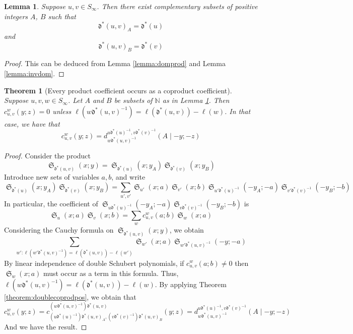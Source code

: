 \documentclass{amsart}
\newtheorem{lemma}{Lemma}[subsection]
\newtheorem{theorem}{Theorem}[section]
\theoremstyle{definition}
\newtheorem{example}[lemma]{Example}
\theoremstyle{remark}
\numberwithin{equation}{subsection}
\DeclareMathOperator{\sch}{\mathfrak{S}}
\newcommand{\cpcf}[5]{d^{#1,#2}_{#3}\left(#4\mid #5\right)}
\newcommand{\dom}{\mathfrak{d}}
\newcommand{\ldom}{\dom^*}
\begin{document}
\begin{lemma} \label{lemma:cansplit}
Suppose $u,v\in S_\infty$. Then there exist complementary subsets of positive integers $A$, $B$ such that
$$\ldom(u,v)_A=\ldom(u)$$
and
$$\ldom(u,v)_B=\ldom(v)$$
\end{lemma}
\begin{proof}
This can be deduced from Lemma \ref{lemma:domprod} and Lemma \ref{lemma:invdom}. 
\end{proof}

\begin{theorem}[Every product coefficient occurs as a coproduct coefficient] \label{theorem:allprod}
Suppose $u,v,w\in S_\infty$. Let $A$ and $B$ be subsets of $\mathbb{N}$ as in Lemma \ref{lemma:cansplit}. Then $c_{u,v}^w(y;z)=0$ unless $\ell(w\ldom(u,v)^{-1})=\ell(\ldom(u,v))-\ell(w)$. In that case, we have that 
$$c_{u,v}^w(y;z)=\cpcf{u\ldom(u)^{-1}}{v\ldom(v)^{-1}}{w\ldom(u,v)^{-1}}{A}{-y;-z}$$
\end{theorem}
\begin{proof}
Consider the product
$$\sch_{\ldom(u,v)}(x;y)=\sch_{\ldom(u)}(x;y_A)\sch_{\ldom(v)}(x;y_B)$$
Introduce new sets of variables $a,b$, and write
$$\sch_{\ldom(u)}(x;y_A)\sch_{\ldom(v)}(x;y_B)=\sum_{u',v'}\sch_{u'}(x;a)\sch_{v'}(x;b)\sch_{u'\ldom(u)^{-1}}(-y_A;-a)\sch_{v'\ldom(v)^{-1}}(-y_B;-b)$$
In particular, the coefficient of $\sch_{u\ldom(u)^{-1}}(-y_A;-a)\sch_{v\ldom(v)^{-1}}(-y_B;-b)$ is
$$\sch_u(x;a)\sch_v(x;b)=\sum_{w}c_{u,v}^w(a;b)\sch_w(x;a)$$
Considering the Cauchy formula on $\sch_{\ldom(u,v)}(x;y)$, we obtain
$$\sum_{w':\ell(w'\ldom(u,v)^{-1})=\ell(\ldom(u,v))-\ell(w')}\sch_{w'}(x;a)\sch_{w'\ldom(u,v)^{-1}}(-y;-a)$$
By linear independence of double Schubert polynomials, if $c_{u,v}^w(a;b)\neq 0$ then $\sch_w(x; a )$ must occur as a term in this formula. Thus, $\ell(w\ldom(u,v)^{-1})=\ell(\ldom(u,v))-\ell(w)$. By applying Theorem \ref{theorem:doublecoprodpos}, we obtain that 
$$c_{u,v}^w(y;z)=c_{(u\ldom(u)^{-1})\ldom(u,v)_A,(v\ldom(v)^{-1})\ldom(u,v)_B}^{(w\ldom(u,v)^{-1})\ldom(u,v)}(y;z)=\cpcf{u\ldom(u)^{-1}}{v\ldom(v)^{-1}}{w\ldom(u,v)^{-1}}{A}{-y;-z}$$
And we have the result.
\end{proof}

%
%
%
%
\end{document}

